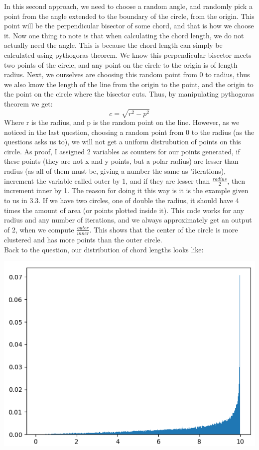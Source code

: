 \documentclass[addpoints]{exam}
\begin{document}
\begin{questions}
\newpage
\question
In this second approach, we need to choose a random angle, and randomly pick a point from the angle extended to the boundary of the circle, from the origin. This point will be the perpendicular bisector of some chord, and that is how we choose it. Now one thing to note is that when calculating the chord length, we do not actually need the angle. This is because the chord length can simply be calculated using pythogoras theorem. We know this perpendicular bisector meets two points of the circle, and any point on the circle to the origin is of length radius. Next, we ourselves are choosing this random point from 0 to radius, thus we also know the length of the line from the origin to the point, and the origin to the point on the circle where the bisector cuts. Thus, by manipulating pythogoras theorem we get:\\
\begin{equation}
 c = \sqrt{r^2 - p^2}
\end{equation}
Where r is the radius, and p is the random point on the line. However, as we noticed in the last question, choosing a random point from 0 to the radius (as the questions asks us to), we will not get a uniform distrubution of points on this circle. As proof, I assigned 2 variables as counters for our points generated, if these points (they are not x and y points, but a polar radius) are lesser than radius (as all of them must be, giving a number the same as 'iterations), increment the variable called outer by 1, and if they are lesser than $\frac{radius}{2}$, then increment inner by 1. The reason for doing it this way is it is the example given to us in 3.3. If we have two circles, one of double the radius, it should have 4 times the amount of area (or points plotted inside it). This code works for any radius and any number of iterations, and we always approximately get an output of 2, when we compute $\frac{outer}{inner}$. This shows that the center of the circle is more clustered and has more points than the outer circle.\\
Back to the question, our distribution of chord lengths looks like:\\
\begin{center}
\includegraphics[width=.48\textwidth]{images/p4_2_1.png}

\end{center}
\end{questions}
\end{document}
